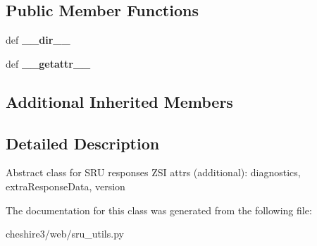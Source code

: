 \subsection*{Public Member Functions}
\begin{DoxyCompactItemize}
\item 
\hypertarget{classcheshire3_1_1web_1_1sru__utils_1_1_sru_response_a60288cc22791ce2d22a51e0c815d1d8b}{def {\bfseries \-\_\-\-\_\-dir\-\_\-\-\_\-}}\label{classcheshire3_1_1web_1_1sru__utils_1_1_sru_response_a60288cc22791ce2d22a51e0c815d1d8b}

\item 
\hypertarget{classcheshire3_1_1web_1_1sru__utils_1_1_sru_response_a548b012d9642640eacc37e0c9ebe375c}{def {\bfseries \-\_\-\-\_\-getattr\-\_\-\-\_\-}}\label{classcheshire3_1_1web_1_1sru__utils_1_1_sru_response_a548b012d9642640eacc37e0c9ebe375c}

\end{DoxyCompactItemize}
\subsection*{Additional Inherited Members}


\subsection{Detailed Description}
\begin{DoxyVerb}Abstract class for SRU responses
ZSI attrs (additional): diagnostics, extraResponseData, version
\end{DoxyVerb}
 

The documentation for this class was generated from the following file\-:\begin{DoxyCompactItemize}
\item 
cheshire3/web/sru\-\_\-utils.\-py\end{DoxyCompactItemize}
